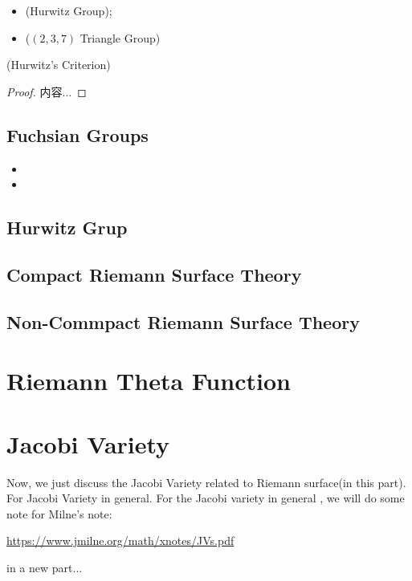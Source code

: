 \documentclass[Total.tex]{subfiles}
\begin{document}
				\begin{Def}
					\begin{itemize}
						\item 
						(Hurwitz Group);
						\item ($(2,3,7)$ Triangle Group)
					\end{itemize}
				\end{Def}
				
				\begin{theorem}
					(Hurwitz's Criterion)
				\end{theorem}
				\begin{proof}
					内容...
				\end{proof}
		\section{Fuchsian Groups}
			\begin{Def}
				\begin{itemize}
					\item 
					\item 
				\end{itemize}
			\end{Def}
		\section{Hurwitz Grup}
		\section{Compact Riemann Surface Theory}
		\section{Non-Commpact Riemann Surface Theory}
	\chapter{Riemann Theta Function}
	\chapter{Jacobi Variety}
		Now, we just discuss the Jacobi Variety related to Riemann surface(in this part). For Jacobi Variety in general. For the Jacobi variety in general , we will do some note for Milne's note:
		\begin{center}
			\url{https://www.jmilne.org/math/xnotes/JVs.pdf}
		\end{center} 
		
		in a new part...
	
\end{document}
